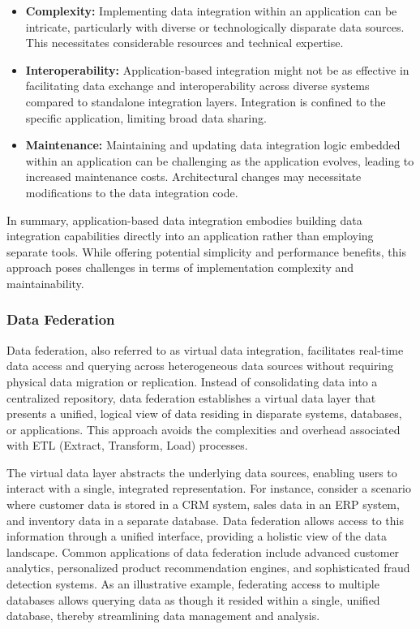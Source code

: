 \documentclass[12pt]{book}
\begin{document}
\begin{itemize}
    \item \textbf{Complexity:} Implementing data integration within an application can be intricate, particularly with diverse or technologically disparate data sources. This necessitates considerable resources and technical expertise.
    \item \textbf{Interoperability:} Application-based integration might not be as effective in facilitating data exchange and interoperability across diverse systems compared to standalone integration layers. Integration is confined to the specific application, limiting broad data sharing.
    \item \textbf{Maintenance:} Maintaining and updating data integration logic embedded within an application can be challenging as the application evolves, leading to increased maintenance costs. Architectural changes may necessitate modifications to the data integration code.
\end{itemize}

In summary, application-based data integration embodies building data integration capabilities directly into an application rather than employing separate tools. While offering potential simplicity and performance benefits, this approach poses challenges in terms of implementation complexity and maintainability.

\subsubsection{Data Federation}
Data federation, also referred to as virtual data integration, facilitates real-time data access and querying across heterogeneous data sources without requiring physical data migration or replication.  Instead of consolidating data into a centralized repository, data federation establishes a virtual data layer that presents a unified, logical view of data residing in disparate systems, databases, or applications. This approach avoids the complexities and overhead associated with ETL (Extract, Transform, Load) processes.

The virtual data layer abstracts the underlying data sources, enabling users to interact with a single, integrated representation.  For instance, consider a scenario where customer data is stored in a CRM system, sales data in an ERP system, and inventory data in a separate database. Data federation allows access to this information through a unified interface, providing a holistic view of the data landscape. Common applications of data federation include advanced customer analytics, personalized product recommendation engines, and sophisticated fraud detection systems. As an illustrative example, federating access to multiple databases allows querying data as though it resided within a single, unified database, thereby streamlining data management and analysis.
\end{document}
